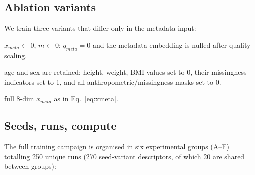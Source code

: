 \documentclass[mathematics,article,pdftex]{Definitions/mdpi}
\def\texttt#1{#1}%
\def\mathrm#1{#1}%
\def\mathbf#1{#1}%
\def\textbf#1{#1}%
\def\emph#1{#1}%
\begin{document}
\subsection{Ablation variants}
We train three variants that differ \emph{only} in the metadata input:
\begin{description}[leftmargin=1.5em, style=sameline, font=\normalfont]
\item[\texttt{none}] $\mathbf{x}_{\mathrm{meta}}{\leftarrow}\mathbf{0}$, $\mathbf{m}{\leftarrow}\mathbf{0}$; $q_{\mathrm{meta}}{=}0$ and the metadata embedding is nulled after quality scaling.
\item[\texttt{demo}] age and sex are retained; height, weight, BMI values set to 0, their missingness indicators set to 1, and all anthropometric/missingness masks set to 0.
\item[\texttt{demo+anthro}] full 8-dim $\mathbf{x}_{\mathrm{meta}}$ as in Eq.~\eqref{eq:xmeta}.
\end{description}

\subsection{Seeds, runs, compute}
The full training campaign is organised in \textbf{six experimental groups (A--F)} totalling \textbf{250 unique runs} (270 seed-variant descriptors, of which 20 are shared between groups):
\end{document}
